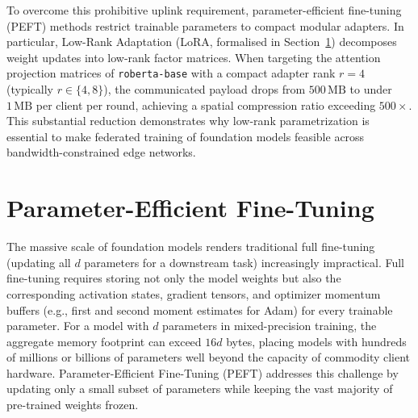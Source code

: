 To overcome this prohibitive uplink requirement, parameter-efficient fine-tuning (PEFT) methods restrict trainable parameters to compact modular adapters. In particular, Low-Rank Adaptation (LoRA, formalised in Section~\ref{sec:peft}) decomposes weight updates into low-rank factor matrices. When targeting the attention projection matrices of \texttt{roberta-base} with a compact adapter rank $r = 4$ (typically $r \in \{4, 8\}$), the communicated payload drops from $500\,\text{MB}$ to under $1\,\text{MB}$ per client per round, achieving a spatial compression ratio exceeding $500\times$. This substantial reduction demonstrates why low-rank parametrization is essential to make federated training of foundation models feasible across bandwidth-constrained edge networks.

\section{Parameter-Efficient Fine-Tuning}
\label{sec:peft}
The massive scale of foundation models renders traditional full fine-tuning (updating all $d$ parameters for a downstream task) increasingly impractical. Full fine-tuning requires storing not only the model weights but also the corresponding activation states, gradient tensors, and optimizer momentum buffers (e.g., first and second moment estimates for Adam) for every trainable parameter. For a model with $d$ parameters in mixed-precision training, the aggregate memory footprint can exceed $16d$ bytes, placing models with hundreds of millions or billions of parameters well beyond the capacity of commodity client hardware. Parameter-Efficient Fine-Tuning (PEFT) addresses this challenge by updating only a small subset of parameters while keeping the vast majority of pre-trained weights frozen.

